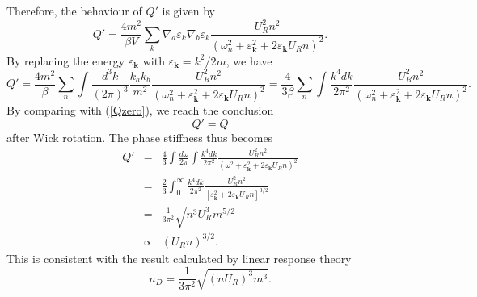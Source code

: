 \documentclass[aps,superscriptaddress,notitlepage,longbibliography]{revtex4-1}
\begin{document}
Therefore, the behaviour of $Q'$ is given by 
\begin{equation}
Q'=\frac{4m^{2}}{\beta V}\sum_{k}\nabla_{a}\varepsilon_{k}\nabla_{b}\varepsilon_{k}\frac{U_{R}^{2}n^{2}}{(\omega_{n}^{2}+\varepsilon_{\bm{k}}^{2}+2\varepsilon_{\bm{k}}U_{R}n)^{2}}.
\end{equation}
By replacing the energy $\varepsilon_{\bm{k}}$ with $\varepsilon_{\bm{k}}=k^{2}/2m$,
we have 
\begin{equation}
Q'=\frac{4m^{2}}{\beta}\sum_{n}\int\frac{d^{3}k}{(2\pi)^{3}}\frac{k_{a}k_{b}}{m^{2}}\frac{U_{R}^{2}n^{2}}{(\omega_{n}^{2}+\varepsilon_{\bm{k}}^{2}+2\varepsilon_{\bm{k}}U_{R}n)^{2}}=\frac{4}{3\beta}\sum_{n}\int\frac{k^{4}dk}{2\pi^{2}}\frac{U_{R}^{2}n^{2}}{(\omega_{n}^{2}+\varepsilon_{\bm{k}}^{2}+2\varepsilon_{\bm{k}}U_{R}n)^{2}}.
\end{equation}
By comparing with (\ref{Qzero}), we reach the conclusion 
\begin{equation}
Q'=Q
\end{equation}
after Wick rotation. The phase stiffness thus becomes 
\begin{eqnarray}
Q' & = & \frac{4}{3}\int\frac{d\omega}{2\pi}\int\frac{k^{4}dk}{2\pi^{2}}\frac{U_{R}^{2}n^{2}}{(\omega^{2}+\varepsilon_{\bm{k}}^{2}+2\varepsilon_{\bm{k}}U_{R}n)^{2}}\nonumber \\
 & = & \frac{2}{3}\int_{0}^{\infty}\frac{k^{4}dk}{2\pi^{2}}\frac{U_{R}^{2}n^{2}}{[\varepsilon_{\bm{k}}^{2}+2\varepsilon_{\bm{k}}U_{R}n]^{3/2}}\nonumber \\
 & = & \frac{1}{3\pi^{2}}\sqrt{n^{3}U_{R}^{3}}m^{5/2}\nonumber \\
 & \propto & (U_{R}n)^{3/2}.\label{QQ}
\end{eqnarray}
This is consistent with the result calculated by linear response theory
\citep{Ueda2010}
\begin{equation}
n_{D}=\frac{1}{3\pi^{2}}\sqrt{(nU_{R})^{3}m^{3}}.
\end{equation}
\end{document}
